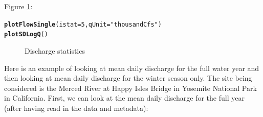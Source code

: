 \documentclass[a4paper,11pt]{article}\usepackage[]{graphicx}\usepackage[]{color}
\makeatletter
\newcommand{\hlnum}[1]{\textcolor[rgb]{0.686,0.059,0.569}{#1}}%
\newcommand{\hlstr}[1]{\textcolor[rgb]{0.192,0.494,0.8}{#1}}%
\newcommand{\hlstd}[1]{\textcolor[rgb]{0.345,0.345,0.345}{#1}}%
\newcommand{\hlkwc}[1]{\textcolor[rgb]{0.333,0.667,0.333}{#1}}%
\newcommand{\hlkwd}[1]{\textcolor[rgb]{0.737,0.353,0.396}{\textbf{#1}}}%
\newenvironment{kframe}{%
 \def\at@end@of@kframe{}%
 \ifinner\ifhmode%
  \def\at@end@of@kframe{\end{minipage}}%
  \begin{minipage}{\columnwidth}%
 \fi\fi%
 \def\FrameCommand##1{\hskip\@totalleftmargin \hskip-\fboxsep
 \colorbox{shadecolor}{##1}\hskip-\fboxsep
     \hskip-\linewidth \hskip-\@totalleftmargin \hskip\columnwidth}%
 \MakeFramed {\advance\hsize-\width
   \@totalleftmargin\z@ \linewidth\hsize
   \@setminipage}}%
 {\par\unskip\endMakeFramed%
 \at@end@of@kframe}
\newenvironment{knitrout}{}{} %
\makeatother
\begin{document}
Figure \ref{fig:plotSingleandSD}:
\begin{knitrout}
\color{fgcolor}\begin{kframe}
\begin{alltt}
\hlkwd{plotFlowSingle}\hlstd{(}\hlkwc{istat}\hlstd{=}\hlnum{5}\hlstd{,}\hlkwc{qUnit}\hlstd{=}\hlstr{"thousandCfs"}\hlstd{)}
\hlkwd{plotSDLogQ}\hlstd{()}
\end{alltt}
\end{kframe}\begin{figure}[]
\caption[Discharge statistics]{Discharge statistics\label{fig:plotSingleandSD}}
\end{figure}


\end{knitrout}

\FloatBarrier

Here is an example of looking at mean daily discharge for the full water year and then looking at mean daily discharge for the winter season only.  The site being considered is the Merced River at Happy Isles Bridge in Yosemite National Park in California.  First, we can look at the mean daily discharge for the full year (after having read in the data and metadata):
\end{document}
